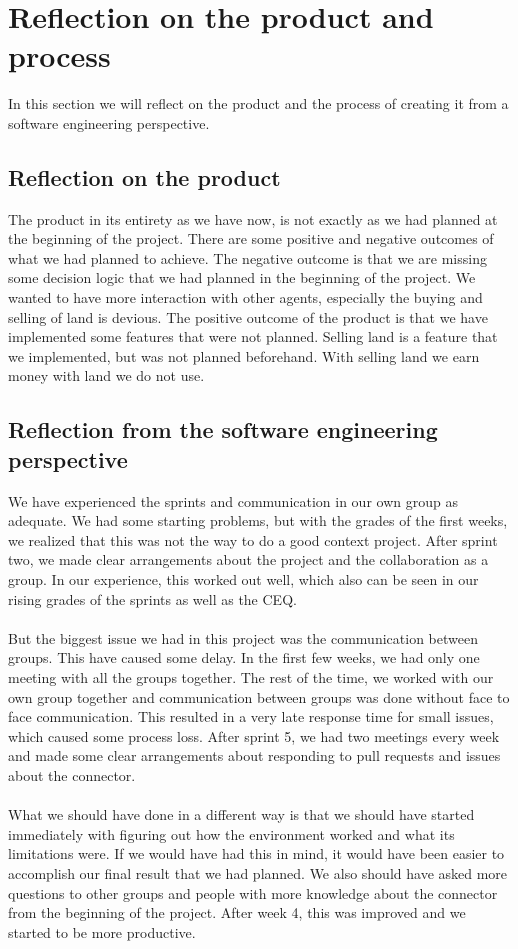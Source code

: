 \chapter{Reflection on the product and process}
In this section we will reflect on the product and the process of creating it from a software engineering perspective.

\section{Reflection on the product}
The product in its entirety as we have now, is not exactly as we had planned at the beginning of the project. There are some positive and negative outcomes of what we had planned to achieve. The negative outcome is that we are missing some decision logic that we had planned in the beginning of the project. We wanted to have more interaction with other agents, especially the buying and selling of land is devious. 
The positive outcome of the product is that we have implemented some features that were not planned. Selling land is a feature that we implemented, but was not planned beforehand. With selling land we earn money with land we do not use.

\section{Reflection from the software engineering perspective}
We have experienced the sprints and communication in our own group as adequate. We had some starting problems, but with the grades of the first weeks, we realized that this was not the way to do a good context project. After sprint two, we made clear arrangements about the project and the collaboration as a group. In our experience, this worked out well, which also can be seen in our rising grades of the sprints as well as the CEQ.
\\\\
But the biggest issue we had in this project was the communication between groups. This have caused some delay. In the first few weeks, we had only one meeting with all the groups together. The rest of the time, we worked with our own group together and communication between groups was done without face to face communication. This resulted in a very late response time for small issues, which caused some process loss. After sprint 5, we had two meetings every week and made some clear arrangements about responding to pull requests and issues about the connector.
\\\\
What we should have done in a different way is that we should have started immediately with figuring out how the environment worked and what its limitations were. If we would have had this in mind, it would have been easier to accomplish our final result that we had planned. We also should have asked more questions to other groups and people with more knowledge about the connector from the beginning of the project. After week 4, this was improved and we started to be more productive.



